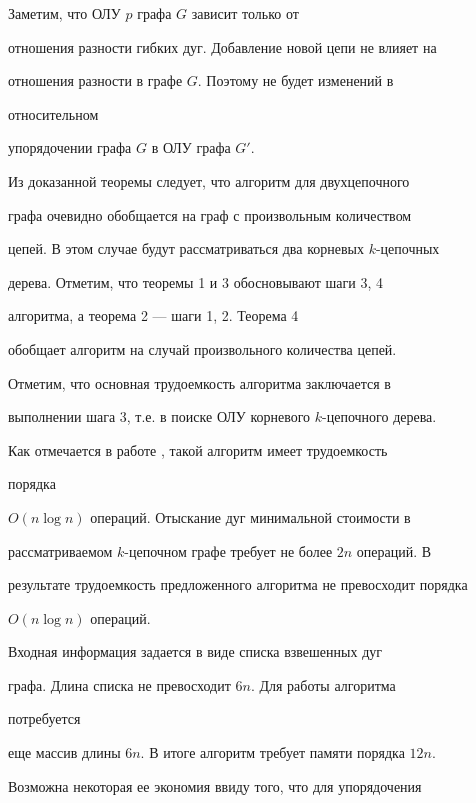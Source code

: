 \begin{pf} Заметим, что ОЛУ $p$ графа $G$ зависит только от


отношения разности гибких дуг. Добавление новой цепи не влияет на


отношения разности в графе $G$. Поэтому не будет изменений в


относительном


упорядочении графа $G$ в ОЛУ графа $G'$.


\end{pf}





Из доказанной теоремы следует, что алгоритм для двухцепочного


графа очевидно обобщается на граф с произвольным количеством


цепей. В этом случае будут рассматриваться два корневых $k$-цепочных


дерева. Отметим, что теоремы 1 и 3 обосновывают шаги 3, 4


алгоритма, а теорема 2 --- шаги 1, 2. Теорема 4


обобщает алгоритм на случай произвольного количества цепей.





Отметим, что основная трудоемкость алгоритма заключается в


выполнении шага 3, т.е. в поиске ОЛУ корневого $k$-цепочного дерева.


Как отмечается в работе \cite{Ado}, такой алгоритм имеет трудоемкость


порядка


$O(n\log n)$ операций. Отыскание дуг минимальной стоимости в


рассматриваемом $k$-цепочном графе требует не более $2n$ операций. В


результате трудоемкость предложенного алгоритма не превосходит порядка


$O(n\log n)$ операций.





Входная информация задается в виде списка взвешенных дуг


графа. Длина списка не превосходит $6n$. Для работы алгоритма


потребуется


еще массив длины $6n$. В итоге алгоритм требует памяти порядка $12n$.


Возможна некоторая ее экономия ввиду того, что для упорядочения


